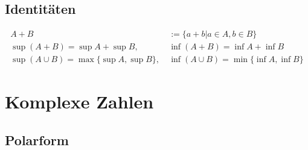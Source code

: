 \documentclass[11pt]{article}
\begin{document}
\subsection{Identitäten}

\begin{equation*}
\begin{split}
	A + B & := \{a + b | a \in A, b \in B\} \\
	\sup(A+B) = \sup A + \sup B,\ & \inf(A+B) = \inf A + \inf B \\
	\sup(A \cup B) = \max\{\sup A, \sup B\},\ & \inf(A \cup B) = \min\{\inf A, \inf B\}
\end{split}
\end{equation*}

\section{Komplexe Zahlen}

\subsection{Polarform}
\end{document}
